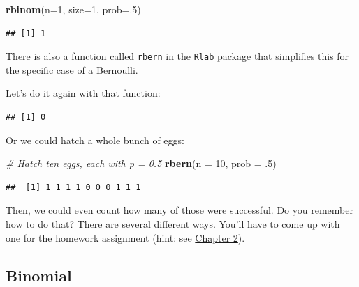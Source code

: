 \documentclass[
]{book}
\newenvironment{Shaded}{\begin{snugshade}}{\end{snugshade}}
\newcommand{\CommentTok}[1]{\textcolor[rgb]{0.56,0.35,0.01}{\textit{#1}}}
\newcommand{\DataTypeTok}[1]{\textcolor[rgb]{0.13,0.29,0.53}{#1}}
\newcommand{\DecValTok}[1]{\textcolor[rgb]{0.00,0.00,0.81}{#1}}
\newcommand{\FloatTok}[1]{\textcolor[rgb]{0.00,0.00,0.81}{#1}}
\newcommand{\KeywordTok}[1]{\textcolor[rgb]{0.13,0.29,0.53}{\textbf{#1}}}
\newcommand{\NormalTok}[1]{#1}
\begin{document}
\begin{Shaded}
\begin{Highlighting}[]
\KeywordTok{rbinom}\NormalTok{(}\DataTypeTok{n=}\DecValTok{1}\NormalTok{, }\DataTypeTok{size=}\DecValTok{1}\NormalTok{, }\DataTypeTok{prob=}\NormalTok{.}\DecValTok{5}\NormalTok{)}
\end{Highlighting}
\end{Shaded}

\begin{verbatim}
## [1] 1
\end{verbatim}

There is also a function called \texttt{rbern} in the \texttt{Rlab} package that simplifies this for the specific case of a Bernoulli.

Let's do it again with that function:

\begin{Shaded}
\end{Shaded}

\begin{verbatim}
## [1] 0
\end{verbatim}

Or we could hatch a whole bunch of eggs:

\begin{Shaded}
\begin{Highlighting}[]
\CommentTok{# Hatch ten eggs, each with p = 0.5}
\KeywordTok{rbern}\NormalTok{(}\DataTypeTok{n =} \DecValTok{10}\NormalTok{, }\DataTypeTok{prob =} \FloatTok{.5}\NormalTok{)}
\end{Highlighting}
\end{Shaded}

\begin{verbatim}
##  [1] 1 1 1 1 0 0 0 1 1 1
\end{verbatim}

Then, we could even count how many of those were successful. Do you remember how to do that? There are several different ways. You'll have to come up with one for the homework assignment (hint: see \protect\hyperlink{Chapter2}{Chapter 2}).

\hypertarget{binomial}{%
\subsection{Binomial}\label{binomial}}
\end{document}
